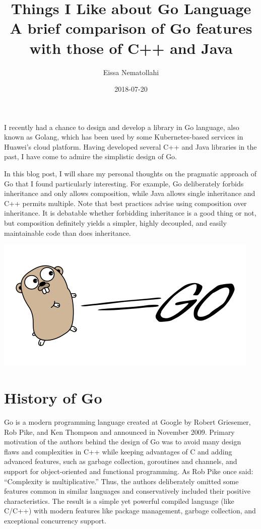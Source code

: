\documentclass[11pt]{article}
\author{Eissa Nematollahi}
\date{2018-07-20}
\title{Things I Like about Go Language\\\medskip
\large A brief comparison of Go features with those of C++ and Java}
\begin{document}
\maketitle
\tableofcontents

I recently had a chance to design and develop a library in Go language, also known as Golang, which has been used by some Kubernetes-based services in Huawei's cloud platform. Having developed several C++ and Java libraries in the past, I have come to admire the simplistic design of Go.

In this blog post, I will share my personal thoughts on the pragmatic approach of Go that I found particularly interesting. For example, Go deliberately forbids inheritance and only allows composition, while Java allows single inheritance and C++ permits multiple. Note that best practices advise using composition over inheritance. It is debatable whether forbidding inheritance is a good thing or not, but composition definitely yields a simpler, highly decoupled, and easily maintainable code than does inheritance.

\includegraphics[width=.9\linewidth]{./images/golang-card.png}

\section*{History of Go}
\label{sec:orgheadline1}
Go is a modern programming language created at Google by Robert Griesemer, Rob Pike, and Ken Thompson and announced in November 2009. Primary motivation of the authors behind the design of Go was to avoid many design flaws and complexities in C++ while keeping advantages of C and adding advanced features, such as garbage collection, goroutines and channels, and support for object-oriented and functional programming. As Rob Pike once said: ``Complexity is multiplicative.'' Thus, the authors deliberately omitted some features common in similar languages and conservatively included their positive characteristics. The result is a simple yet powerful compiled language (like C/C++) with modern features like package management, garbage collection, and exceptional concurrency support.
\end{document}
